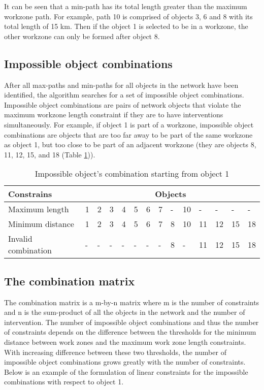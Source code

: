 \documentclass[a4paper,3p,times,authoryear]{elsarticle}
\begin{document}
It can be seen that a min-path has its total length greater than the maximum
workzone path. For example, path 10 is comprised of objects 3, 6 and 8 with its
total length of 15 km. Then if the object 1 is selected to be in a workzone, the
other workzone can only be formed after object 8.

\subsection{Impossible object combinations}

After all max-paths and min-paths for all objects in the network have been
identified, the algorithm searches for a set of impossible object combinations.
Impossible object combinations are pairs of network objects that violate the
maximum workzone length constraint if they are to have interventions
simultaneously. For example, if object 1 is part of a workzone, impossible object
combinations are objects that are too far away to be part of the same workzone as
object 1, but too close to be part of an adjacent workzone (they are objects 8,
11, 12, 15, and 18 (Table \ref{tbl:3})).
\begin{table}[H]
	\centering
	\caption{Impossible object's combination starting from object 1} \label{tbl:3}
	\begin{tabular}{|l|l|l|l|l|l|l|l|l|l|l|l|l|l|}
\hline
Constrains & \multicolumn{13}{c|}{Objects} \\ 
\hline
Maximum length & 1 & 2 & 3 & 4 & 5 & 6 & 7 & - & 10 & - & - & - & - \\ 
\hline
Minimum distance & 1 & 2 & 3 & 4 & 5 & 6 & 7 & 8 & 10 & 11 & 12 & 15 & 18 \\ 
\hline
Invalid combination & - & - & - & - & - & - & - & \cellcolor{blue!25}8 & - & \cellcolor{blue!25}11 & \cellcolor{blue!25}12 & \cellcolor{blue!25}15 & \cellcolor{blue!25}18 \\ 
\hline
\end{tabular}
\end{table}
\subsection{The combination matrix}

The combination matrix is a m-by-n matrix where m is the number of constraints
and n is the sum-product of all the objects in the network and the number of
intervention. The number of impossible object combinations and thus the number of
constraints depends on the difference between the thresholds for the minimum
distance between work zones and the maximum work zone length constraints. With
increasing difference between these two thresholds, the number of impossible
object combinations grows greatly with the number of constraints. Below is an
example of the formulation of linear constraints for the impossible combinations
with respect to object 1.
\end{document}

